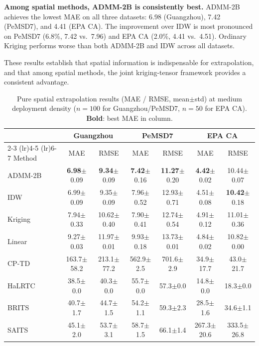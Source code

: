 \documentclass[journal]{IEEEtran}
\begin{document}
\textbf{Among spatial methods, ADMM-2B is consistently best.}
ADMM-2B achieves the lowest MAE on all three datasets: 6.98 (Guangzhou), 7.42 (PeMSD7), and 4.41 (EPA CA). The improvement over IDW is most pronounced on PeMSD7 (6.8\%, 7.42 vs.\ 7.96) and EPA CA (2.0\%, 4.41 vs.\ 4.51). Ordinary Kriging performs worse than both ADMM-2B and IDW across all datasets.

These results establish that spatial information is indispensable for extrapolation, and that among spatial methods, the joint kriging-tensor framework provides a consistent advantage.

\begin{table}[htbp]
  \centering
  \caption{Pure spatial extrapolation results (MAE / RMSE, mean$\pm$std) at medium deployment density ($n{=}100$ for Guangzhou/PeMSD7, $n{=}50$ for EPA CA). \textbf{Bold}: best MAE in column.}
  \label{tab:pure}
  \small
  \setlength{\tabcolsep}{3pt}
  \begin{tabular}{lcccccc}
    \toprule
    & \multicolumn{2}{c}{Guangzhou} & \multicolumn{2}{c}{PeMSD7} & \multicolumn{2}{c}{EPA CA} \\
    \cmidrule(lr){2-3} \cmidrule(lr){4-5} \cmidrule(lr){6-7}
    Method & MAE & RMSE & MAE & RMSE & MAE & RMSE \\
    \midrule
    ADMM-2B & \textbf{6.98}$\pm$0.09 & \textbf{9.34}$\pm$0.09 & \textbf{7.42}$\pm$0.16 & \textbf{11.27}$\pm$0.20 & \textbf{4.42}$\pm$0.02 & 10.44$\pm$0.07 \\
    IDW & 6.99$\pm$0.09 & 9.35$\pm$0.09 & 7.96$\pm$0.52 & 12.93$\pm$0.71 & 4.51$\pm$0.08 & \textbf{10.42}$\pm$0.18 \\
    Kriging & 7.94$\pm$0.33 & 10.62$\pm$0.40 & 7.90$\pm$0.41 & 12.74$\pm$0.54 & 4.91$\pm$0.12 & 11.01$\pm$0.36 \\
    \midrule
    Linear & 9.27$\pm$0.03 & 11.97$\pm$0.01 & 9.93$\pm$0.18 & 13.73$\pm$0.01 & 4.84$\pm$0.02 & 10.82$\pm$0.00 \\
    CP-TD & 163.7$\pm$58.2 & 213.1$\pm$77.2 & 562.9$\pm$2.5 & 701.6$\pm$2.9 & 34.9$\pm$17.7 & 43.0$\pm$21.7 \\
    HaLRTC & 38.5$\pm$0.0 & 40.3$\pm$0.0 & 55.7$\pm$0.0 & 57.3$\pm$0.0 & 14.8$\pm$0.0 & 18.3$\pm$0.0 \\
    BRITS & 40.7$\pm$1.7 & 44.7$\pm$1.5 & 54.2$\pm$1.1 & 59.3$\pm$2.3 & 28.5$\pm$1.6 & 34.6$\pm$1.1 \\
    SAITS & 45.1$\pm$2.0 & 53.7$\pm$3.1 & 58.7$\pm$1.5 & 66.1$\pm$1.4 & 267.3$\pm$20.6 & 333.5$\pm$26.8 \\
    \bottomrule
  \end{tabular}
\end{table}
\end{document}
